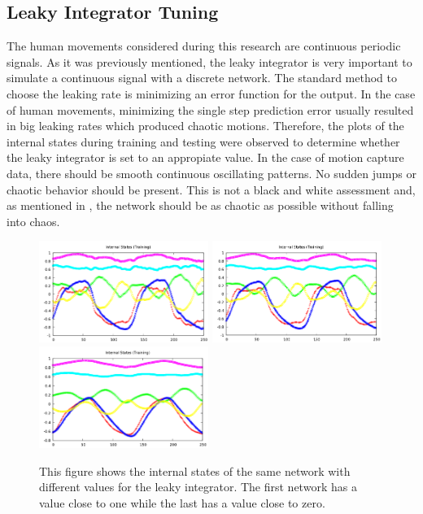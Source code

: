 \documentclass[letterpaper,9pt]{article}
\begin{document}
\pagebreak
\subsection{Leaky Integrator Tuning}

The human movements considered during this research are continuous periodic signals. As it was previously mentioned, the leaky integrator is very important to simulate a continuous signal with a discrete network. The standard method to choose the leaking rate is minimizing an error function for the output. In the case of human movements, minimizing the single step prediction error usually resulted in big leaking rates which produced chaotic motions. Therefore, the plots of the internal states during training and testing were observed to determine whether the leaky integrator is set to an appropiate value. In the case of motion capture data, there should be smooth continuous oscillating patterns. No sudden jumps or chaotic behavior should be present. This is not a black and white assessment and, as mentioned in \cite{ESNVerstraeten}, the network should be as chaotic as possible without falling into chaos.

\begin{figure}[h!]
  \centering
  \includegraphics[height=125px]{Extra/sample_leaky_big.png}
  \includegraphics[height=125px]{Extra/sample_leaky_ok.png}
  \includegraphics[height=125px]{Extra/sample_leaky_low.png}
    \caption[Leaky Integrator Comparison]{This figure shows the internal states of the same network with different values for the leaky integrator. The first network has a value close to one while the last has a value close to zero.}
\end{figure}
\end{document}
